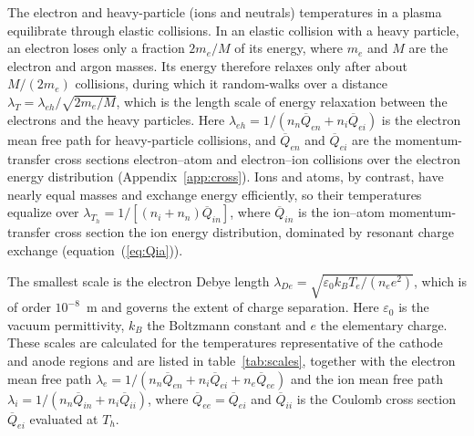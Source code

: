 The electron and heavy-particle (ions and neutrals) temperatures in a plasma equilibrate through elastic collisions. In an elastic collision with a heavy particle, an electron loses only a fraction \(2m_e/M\) of its energy, where \(m_e\) and \(M\) are the electron and argon masses. Its energy therefore relaxes only after about \(M/(2m_e)\) collisions, during which it random-walks over a distance \(\lambda_T=\lambda_{eh}/\sqrt{2m_e/M}\), which is the length scale of energy relaxation between the electrons and the heavy particles. Here \(\lambda_{eh}=1/(n_n\overline{Q}_{en}+n_i\overline{Q}_{ei})\) is the electron mean free path for heavy-particle collisions, and \(\overline{Q}_{en}\) and \(\overline{Q}_{ei}\) are the  momentum-transfer cross sections  electron--atom and electron--ion collisions over the electron energy distribution (Appendix~\ref{app:cross}). Ions and atoms, by contrast, have nearly equal masses and exchange energy efficiently, so their temperatures equalize over \(\lambda_{T_h}=1/[(n_i+n_n)\overline{Q}_{in}]\), where \(\overline{Q}_{in}\) is the  ion--atom momentum-transfer cross section  the ion energy distribution, dominated by resonant charge exchange (equation~(\ref{eq:Qia})).

The smallest scale is the electron Debye length \(\lambda_{De}=\sqrt{\varepsilon_0k_BT_e/(n_ee^2)}\), which is of order \(10^{-8}\)~m and governs the extent of charge separation. Here \(\varepsilon_0\) is the vacuum permittivity, \(k_B\) the Boltzmann constant and \(e\) the elementary charge. These scales are calculated for the temperatures representative of the cathode and anode regions and are listed in table~\ref{tab:scales}, together with the electron mean free path \(\lambda_e=1/(n_n\overline{Q}_{en}+n_i\overline{Q}_{ei}+n_e\overline{Q}_{ee})\) and the ion mean free path \(\lambda_i=1/(n_n\overline{Q}_{in}+n_i\overline{Q}_{ii})\), where \(\overline{Q}_{ee}=\overline{Q}_{ei}\) and \(\overline{Q}_{ii}\) is the  Coulomb cross section \(\overline{Q}_{ei}\) evaluated at \(T_h\).


